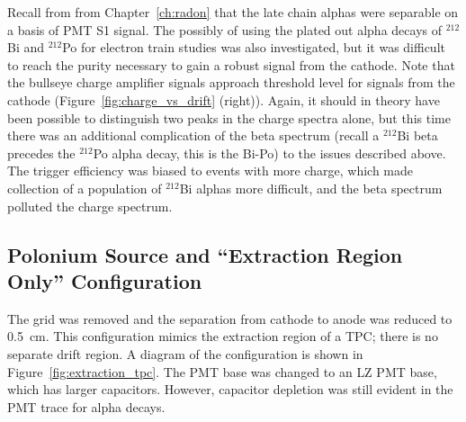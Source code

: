 Recall from from Chapter~\ref{ch:radon} that the late chain alphas were separable on a basis of \ac{PMT} S1 signal. The possibly of using the plated out alpha decays of $^{212}$Bi and $^{212}$Po for electron train studies was also investigated, but it was difficult to reach the purity necessary to gain a robust signal from the cathode. Note that the bullseye charge amplifier signals approach threshold level for signals from the cathode (Figure~\ref{fig:charge_vs_drift} (right)). Again, it should in theory have been possible to distinguish two peaks in the charge spectra alone, but this time there was an additional complication of the beta spectrum (recall a $^{212}$Bi beta precedes the $^{212}$Po alpha decay, this is the Bi-Po) to the issues described above. The trigger efficiency was biased to events with more charge, which made collection of a population of $^{212}$Bi alphas more difficult, and the beta spectrum polluted the charge spectrum. 


\subsection{Polonium Source and ``Extraction Region Only'' Configuration}
The grid was removed and the separation from cathode to anode was reduced to 0.5~cm. This configuration mimics the extraction region of a \ac{TPC}; there is no separate drift region. A diagram of the configuration is shown in Figure~\ref{fig:extraction_tpc}. The \ac{PMT} base was changed to an \ac{LZ} \ac{PMT} base, which has larger capacitors. However, capacitor depletion was still evident in the \ac{PMT} trace for alpha decays.  

